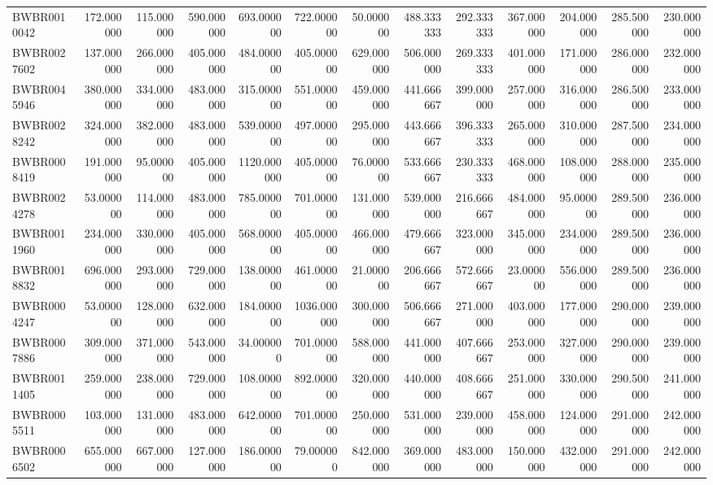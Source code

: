 \begin{longtable}{lrrrrrrrrrrrr}
BWBR0010042 & 172.000000 & 115.000000 & 590.000000 & 693.000000 & 722.000000 & 50.000000 & 488.333333 & 292.333333 & 367.000000 & 204.000000 & 285.500000 & 230.000000 \\
BWBR0027602 & 137.000000 & 266.000000 & 405.000000 & 484.000000 & 405.000000 & 629.000000 & 506.000000 & 269.333333 & 401.000000 & 171.000000 & 286.000000 & 232.000000 \\
BWBR0045946 & 380.000000 & 334.000000 & 483.000000 & 315.000000 & 551.000000 & 459.000000 & 441.666667 & 399.000000 & 257.000000 & 316.000000 & 286.500000 & 233.000000 \\
BWBR0028242 & 324.000000 & 382.000000 & 483.000000 & 539.000000 & 497.000000 & 295.000000 & 443.666667 & 396.333333 & 265.000000 & 310.000000 & 287.500000 & 234.000000 \\
BWBR0008419 & 191.000000 & 95.000000 & 405.000000 & 1120.000000 & 405.000000 & 76.000000 & 533.666667 & 230.333333 & 468.000000 & 108.000000 & 288.000000 & 235.000000 \\
BWBR0024278 & 53.000000 & 114.000000 & 483.000000 & 785.000000 & 701.000000 & 131.000000 & 539.000000 & 216.666667 & 484.000000 & 95.000000 & 289.500000 & 236.000000 \\
BWBR0011960 & 234.000000 & 330.000000 & 405.000000 & 568.000000 & 405.000000 & 466.000000 & 479.666667 & 323.000000 & 345.000000 & 234.000000 & 289.500000 & 236.000000 \\
BWBR0018832 & 696.000000 & 293.000000 & 729.000000 & 138.000000 & 461.000000 & 21.000000 & 206.666667 & 572.666667 & 23.000000 & 556.000000 & 289.500000 & 236.000000 \\
BWBR0004247 & 53.000000 & 128.000000 & 632.000000 & 184.000000 & 1036.000000 & 300.000000 & 506.666667 & 271.000000 & 403.000000 & 177.000000 & 290.000000 & 239.000000 \\
BWBR0007886 & 309.000000 & 371.000000 & 543.000000 & 34.000000 & 701.000000 & 588.000000 & 441.000000 & 407.666667 & 253.000000 & 327.000000 & 290.000000 & 239.000000 \\
BWBR0011405 & 259.000000 & 238.000000 & 729.000000 & 108.000000 & 892.000000 & 320.000000 & 440.000000 & 408.666667 & 251.000000 & 330.000000 & 290.500000 & 241.000000 \\
BWBR0005511 & 103.000000 & 131.000000 & 483.000000 & 642.000000 & 701.000000 & 250.000000 & 531.000000 & 239.000000 & 458.000000 & 124.000000 & 291.000000 & 242.000000 \\
BWBR0006502 & 655.000000 & 667.000000 & 127.000000 & 186.000000 & 79.000000 & 842.000000 & 369.000000 & 483.000000 & 150.000000 & 432.000000 & 291.000000 & 242.000000 \\

\end{longtable}
